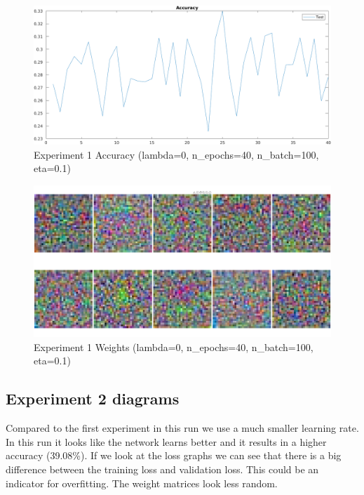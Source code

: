     \begin{figure}[ht]
        \includegraphics[width=\textwidth]{../code/result_pics/lambda=0, n_epochs=40, n_batch=100, eta=.1/accuracy.png}
        \caption{Experiment 1 Accuracy (lambda=0, n\_epochs=40, n\_batch=100, eta=0.1)}
        \label{fig:accuracy1}
    \end{figure}

    \begin{figure}[ht]
        \includegraphics[width=\textwidth]{../code/result_pics/lambda=0, n_epochs=40, n_batch=100, eta=.1/weights.png}
        \caption{Experiment 1 Weights (lambda=0, n\_epochs=40, n\_batch=100, eta=0.1)}
        \label{fig:weights1}
    \end{figure}

\clearpage
\subsection{Experiment 2 diagrams}
Compared to the first experiment in this run we use a much smaller learning rate. In this run it looks like the network learns better and it results in a higher
accuracy (39.08\%). If we look at the loss graphs we can see that there is a big difference between the training loss and validation loss. 
This could be an indicator for overfitting. The weight matrices look less random.

